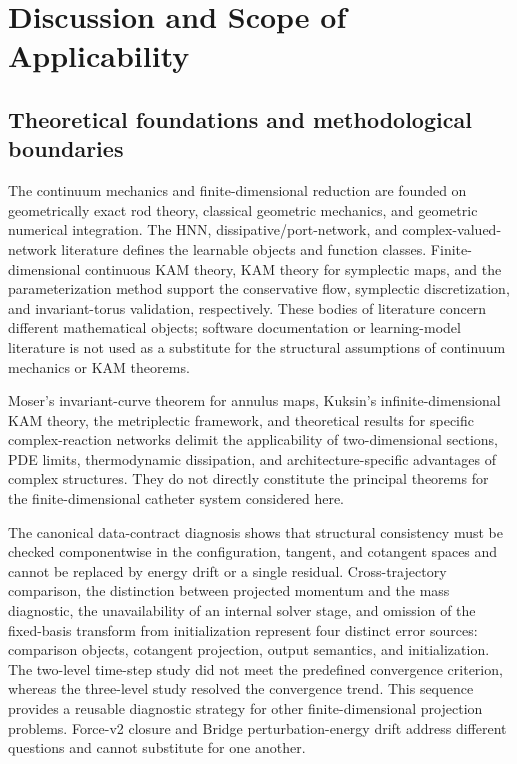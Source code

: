 \section{Discussion and Scope of Applicability}\label{sec:discussion}

\subsection{Theoretical foundations and methodological boundaries}\label{sec:discussion-7-1}

The continuum mechanics and finite-dimensional reduction are founded on geometrically exact rod theory, classical geometric mechanics, and geometric numerical integration. The HNN, dissipative/port-network, and complex-valued-network literature defines the learnable objects and function classes. Finite-dimensional continuous KAM theory, KAM theory for symplectic maps, and the parameterization method support the conservative flow, symplectic discretization, and invariant-torus validation, respectively. These bodies of literature concern different mathematical objects; software documentation or learning-model literature is not used as a substitute for the structural assumptions of continuum mechanics or KAM theorems.\cite{Simo1985FiniteStrainBeam,Antman2005Elasticity,MarsdenRatiu1999MechanicsSymmetry,HairerLubichWanner2006GNI,Greydanus2019HNN,Zhong2020Dissipative,Desai2021PHNN,Chen2022KAMSLT,Trabelsi2018DeepComplex,Hirose2012CVNN,FengQin2010,Shang1999KAMAlgorithms,Shang2000KAMMappings,Haro2016Parameterization,Arnold1989ClassicalMechanics,Poschel2001KAMLecture}

Moser's invariant-curve theorem for annulus maps, Kuksin's infinite-dimensional KAM theory, the metriplectic framework, and theoretical results for specific complex-reaction networks delimit the applicability of two-dimensional sections, PDE limits, thermodynamic dissipation, and architecture-specific advantages of complex structures. They do not directly constitute the principal theorems for the finite-dimensional catheter system considered here.\cite{Coquinot2020Metriplectic,Moser1962InvariantCurves,Kuksin1993InfiniteDimensionalKAM,Poschel2001KAMLecture,Zhang2022ComplexReaction}

The canonical data-contract diagnosis shows that structural consistency must be checked componentwise in the configuration, tangent, and cotangent spaces and cannot be replaced by energy drift or a single residual. Cross-trajectory comparison, the distinction between projected momentum and the mass diagnostic, the unavailability of an internal solver stage, and omission of the fixed-basis transform from initialization represent four distinct error sources: comparison objects, cotangent projection, output semantics, and initialization. The two-level time-step study did not meet the predefined convergence criterion, whereas the three-level study resolved the convergence trend. This sequence provides a reusable diagnostic strategy for other finite-dimensional projection problems. Force-v2 closure and Bridge perturbation-energy drift address different questions and cannot substitute for one another.

